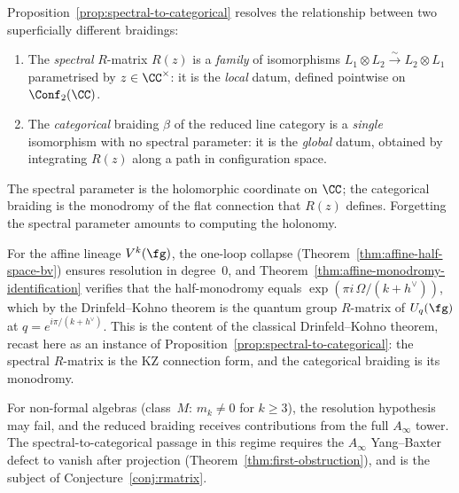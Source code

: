 \begin{remark}
\label{rem:spectral-vs-categorical}
Proposition~\ref{prop:spectral-to-categorical} resolves the
relationship between two superficially different braidings:
\begin{enumerate}[label=\textup{(\roman*)}]
\item The \emph{spectral} $R$-matrix $R(z)$ is a \emph{family} of
 isomorphisms $L_1 \otimes L_2 \xrightarrow{\sim} L_2 \otimes L_1$
 parametrised by $z \in \CC^\times$: it is the \emph{local} datum,
 defined pointwise on $\Conf_2(\CC)$.
\item The \emph{categorical} braiding $\beta$ of the reduced line
 category is a \emph{single} isomorphism with no spectral parameter:
 it is the \emph{global} datum, obtained by integrating $R(z)$ along
 a path in configuration space.
\end{enumerate}
The spectral parameter is the holomorphic coordinate on $\CC$; the
categorical braiding is the monodromy of the flat connection that
$R(z)$ defines. Forgetting the spectral parameter amounts to
computing the holonomy.

For the affine lineage $V^k(\fg)$, the one-loop collapse
(Theorem~\ref{thm:affine-half-space-bv}) ensures resolution in
degree~$0$, and
Theorem~\ref{thm:affine-monodromy-identification} verifies that
the half-monodromy equals
$\exp(\pi i\, \Omega/(k + h^\vee))$, which by the Drinfeld--Kohno
theorem is the quantum group $R$-matrix of $U_q(\fg)$ at
$q = e^{i\pi/(k+h^\vee)}$. This is the content of the classical
Drinfeld--Kohno theorem, recast here as an instance of
Proposition~\ref{prop:spectral-to-categorical}: the spectral
$R$-matrix is the KZ connection form, and the categorical braiding
is its monodromy.

For non-formal algebras (class~$M$: $m_k \neq 0$ for $k \geq 3$),
the resolution hypothesis may fail, and the reduced braiding
receives contributions from the full $A_\infty$ tower. The
spectral-to-categorical passage in this regime requires the
$A_\infty$ Yang--Baxter defect to vanish after projection
(Theorem~\ref{thm:first-obstruction}), and is the subject of
Conjecture~\ref{conj:rmatrix}.
\end{remark}

